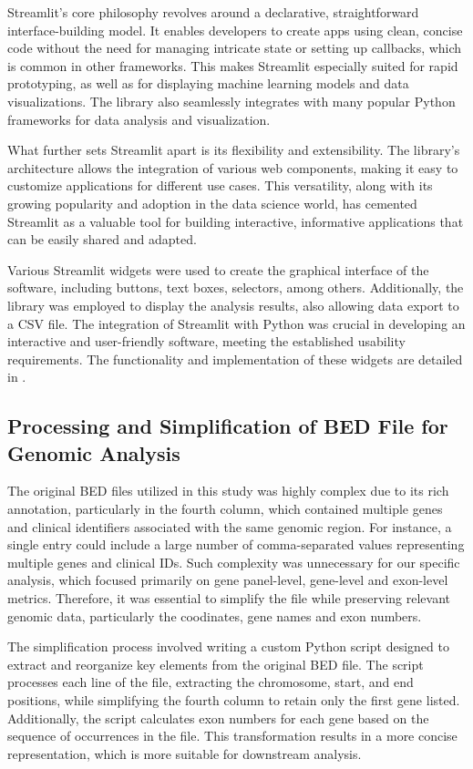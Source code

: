 Streamlit's core philosophy revolves around a declarative, straightforward interface-building model. It enables developers to create apps using clean, concise code without the need for managing intricate state or setting up callbacks, which is common in other frameworks. This makes Streamlit especially suited for rapid prototyping, as well as for displaying machine learning models and data visualizations. The library also seamlessly integrates with many popular Python frameworks for data analysis and visualization. \cite{Sehm2022}

What further sets Streamlit apart is its flexibility and extensibility. The library's architecture allows the integration of various web components, making it easy to customize applications for different use cases. This versatility, along with its growing popularity and adoption in the data science world, has cemented Streamlit as a valuable tool for building interactive, informative applications that can be easily shared and adapted. \cite{Dayanithi2023}

Various Streamlit widgets were used to create the graphical interface of the software, including buttons, text boxes, selectors, among others. Additionally, the library was employed to display the analysis results, also allowing data export to a CSV file. The integration of Streamlit with Python was crucial in developing an interactive and user-friendly software, meeting the established usability requirements. The functionality and implementation of these widgets are detailed in \cite{streamlit_doc}.

\subsection{Processing and Simplification of BED File for Genomic Analysis}

The original BED files utilized in this study was highly complex due to its rich annotation, particularly in the fourth column, which contained multiple genes and clinical identifiers associated with the same genomic region. For instance, a single entry could include a large number of comma-separated values representing multiple genes and clinical IDs. Such complexity was unnecessary for our specific analysis, which focused primarily on gene panel-level, gene-level and exon-level metrics. Therefore, it was essential to simplify the file while preserving relevant genomic data, particularly the coodinates, gene names and exon numbers.

The simplification process involved writing a custom Python script designed to extract and reorganize key elements from the original BED file. The script processes each line of the file, extracting the chromosome, start, and end positions, while simplifying the fourth column to retain only the first gene listed. Additionally, the script calculates exon numbers for each gene based on the sequence of occurrences in the file. This transformation results in a more concise representation, which is more suitable for downstream analysis.

